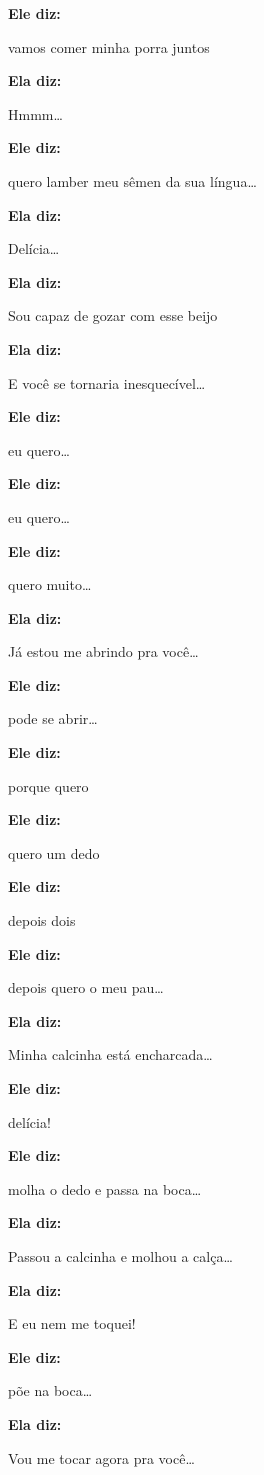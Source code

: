 \textbf{Ele diz:}

vamos comer minha porra juntos

\textbf{Ela diz:}

Hmmm…

\textbf{Ele diz:}

quero lamber meu sêmen da sua língua…

\textbf{Ela diz:}

Delícia…

\textbf{Ela diz:}

Sou capaz de gozar com esse beijo

\textbf{Ela diz:}

E você se tornaria inesquecível…

\textbf{Ele diz:}

eu quero…

\textbf{Ele diz:}

eu quero…

\textbf{Ele diz:}

quero muito…

\textbf{Ela diz:}

Já estou me abrindo pra você…

\textbf{Ele diz:}

pode se abrir…

\textbf{Ele diz:}

porque quero

\textbf{Ele diz:}

quero um dedo

\textbf{Ele diz:}

depois dois

\textbf{Ele diz:}

depois quero o meu pau…

\textbf{Ela diz:}

Minha calcinha está encharcada…

\textbf{Ele diz:}

delícia!

\textbf{Ele diz:}

molha o dedo e passa na boca…

\textbf{Ela diz:}

Passou a calcinha e molhou a calça…

\textbf{Ela diz:}

E eu nem me toquei!

\textbf{Ele diz:}

põe na boca…

\textbf{Ela diz:}

Vou me tocar agora pra você…

